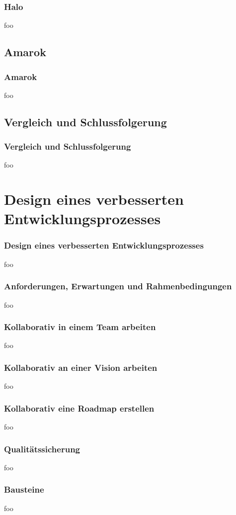\documentclass{beamer}
\begin{document}
\begin{frame}
\frametitle{Halo}
foo
\end{frame}

\subsection{Amarok}

\begin{frame}
\frametitle{Amarok}
foo
\end{frame}

\subsection{Vergleich und Schlussfolgerung}

\begin{frame}
\frametitle{Vergleich und Schlussfolgerung}
foo
\end{frame}

\section{Design eines verbesserten Entwicklungsprozesses}

\begin{frame}
\frametitle{Design eines verbesserten Entwicklungsprozesses}
foo
\end{frame}

\begin{frame}
\frametitle{Anforderungen, Erwartungen und Rahmenbedingungen}
foo
\end{frame}

\begin{frame}
\frametitle{Kollaborativ in einem Team arbeiten}
foo
\end{frame}

\begin{frame}
\frametitle{Kollaborativ an einer Vision arbeiten}
foo
\end{frame}

\begin{frame}
\frametitle{Kollaborativ eine Roadmap erstellen}
foo
\end{frame}

\begin{frame}
\frametitle{Qualit\"atssicherung}
foo
\end{frame}

\begin{frame}
\frametitle{Bausteine}
foo
\end{frame}
\end{document}
